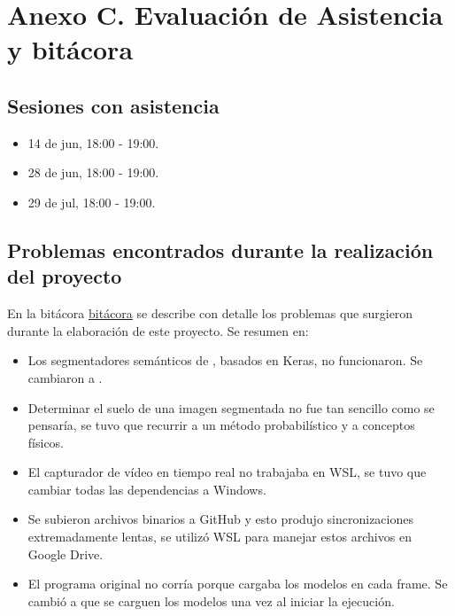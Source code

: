 \section*{Anexo C. Evaluación de Asistencia y bitácora}

\subsection*{Sesiones con asistencia}

\begin{itemize}
    \item 14 de jun, 18:00 - 19:00.
    \item 28 de jun, 18:00 - 19:00.
    \item 29 de jul, 18:00 - 19:00.
\end{itemize}



\subsection*{Problemas encontrados durante la realización del proyecto}

En la bitácora \hyperref[sec:bitacora]{bitácora} se describe con detalle los problemas que surgieron durante la elaboración de este proyecto. Se resumen en:

\begin{itemize}
    \item Los segmentadores semánticos de \textcite{gupta2022}, basados en Keras, no funcionaron. Se cambiaron a \textcite{aung2022}.
    \item Determinar el suelo de una imagen segmentada no fue tan sencillo como se pensaría, se tuvo que recurrir a un método probabilístico y a conceptos físicos.
    \item El capturador de vídeo en tiempo real no trabajaba en WSL, se tuvo que cambiar todas las dependencias a Windows.
    \item Se subieron archivos binarios a GitHub y esto produjo sincronizaciones extremadamente lentas, se utilizó WSL para manejar estos archivos en Google Drive.
    \item El programa original no corría porque cargaba los modelos en cada frame. Se cambió a que se carguen los modelos una vez al iniciar la ejecución. 
\end{itemize}




